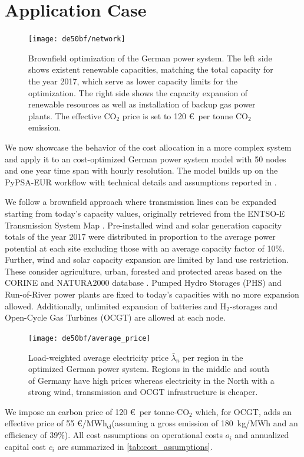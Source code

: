 \documentclass[11pt,twocolumn]{article}
\newcommand{\averagelmp}{\bar{\lambda}_n}
\newcommand{\megawatthour}{MWh$_\text{el}$}
\begin{document}
\section{Application Case}
\label{sec:application_case}
% 
\begin{figure}[t]
    \centering
    \texttt{[image: de50bf/network]}
    \caption{Brownfield optimization of the German power system. The left side shows existent renewable capacities, matching the total capacity for the year 2017, which serve as lower capacity limits for the optimization. The right side shows the capacity expansion of renewable resources as well as installation of backup gas power plants. The effective CO$_2$ price is set to 120 \euro\, per tonne CO$_2$ emission.}
    \label{fig:network}
\end{figure}
% 
We now showcase the behavior of the cost allocation in a more complex system and apply it to an cost-optimized German power system model with 50 nodes and one year time span with hourly resolution. The model builds up on the PyPSA-EUR workflow \cite{horsch_jonas_pypsa-eur_2020} with technical details and assumptions reported in \cite{horsch_pypsa-eur_2018}. 

We follow a brownfield approach where transmission lines can be expanded starting from today's capacity values, originally retrieved from the ENTSO-E Transmission System Map \cite{entso-e_entso-e_nodate}. Pre-installed wind and solar generation capacity totals of the year 2017 were distributed in proportion to the average power potential at each site excluding those with an average capacity factor of 10\%. Further, wind and solar capacity expansion are limited by land use restriction. These consider agriculture, urban, forested and protected areas based on the CORINE and NATURA2000 database \cite{corine2012,natura2000}. Pumped Hydro Storages (PHS) and Run-of-River power plants are fixed to today's capacities with no more expansion allowed. Additionally, unlimited expansion of batteries and H$_{2}$-storages and Open-Cycle Gas Turbines (OCGT) are allowed at each node. 
% 
% 
\begin{figure}
    \centering
    \texttt{[image: de50bf/average\_price]}
    \caption{Load-weighted average electricity price $\averagelmp$ per region in the optimized German power system. Regions in the middle and south of Germany have high prices whereas electricity in the North with a strong wind, transmission and OCGT infrastructure is cheaper.}
    \label{fig:average_price}
\end{figure}
We impose an carbon price of 120 \euro\, per tonne-CO$_{2}$ which, for OCGT, adds an effective price of 55 \euro/\megawatthour (assuming a gross emission of 180~kg/MWh and an efficiency of 39\%). All cost assumptions on operational costs $o_i$ and annualized capital cost $c_i$ are summarized in \cref{tab:cost_assumptions}. 
\end{document}

